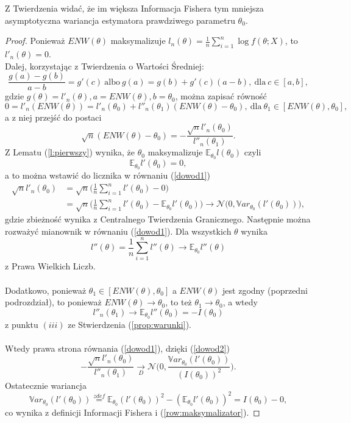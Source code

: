 Z Twierdzenia widać, że im większa Informacja Fishera tym mniejsza asymptotyczna wariancja estymatora prawdziwego parametru $\theta_0$.

\begin{proof}
Ponieważ $ENW(\theta)$ maksymalizuje $l_n(\theta) = \frac{1}{n}\sum\limits_{i=1}^{n}\log f(\theta;X)$, to $l'_n(\theta)=0$. \\ Dalej, korzystając z Twierdzenia o Wartości Średniej:
$$\dfrac{g(a)-g(b)}{a-b} = g'(c) \ \text{albo} \ g(a)=g(b)+g'(c)(a-b), \ \text{dla} \ c \in [a,b],$$
gdzie $g(\theta) = l'_n(\theta), a = ENW(\theta), b = \theta_0$, można zapisać równość
$$ 0 = l'_n(ENW(\theta)) = l'_n(\theta_0) + l''_n(\theta_1)(ENW(\theta)-\theta_0), \ \text{dla} \ \theta_1 \in [ENW(\theta),\theta_0],$$ 
a z niej przejść do postaci 
\begin{equation}\label{dowod1}
\sqrt{n}(ENW(\theta)-\theta_0) = - \dfrac{\sqrt{n}l'_n(\theta_0)}{l''_n(\theta_1)}.
\end{equation}
Z Lematu (\ref{l:pierwszy}) wynika, że $\theta_0$ maksymalizuje $\mathbb{E}_{\theta_0}l(\theta_0)$ czyli
\begin{equation}\label{row:maksymalizator}
\mathbb{E}_{\theta_0}l'(\theta_0) = 0,
\end{equation}
a to można wstawić do licznika w równaniu (\ref{dowod1})
\begin{equation}\label{dowod2}
\begin{split}
\sqrt{n}l'_n(\theta_0) & = \sqrt{n}\Big(\frac{1}{n}\sum\limits_{i=1}^{n}l'(\theta_0) - 0\Big) \\
& = \sqrt{n}\Big(\frac{1}{n}\sum\limits_{i=1}^{n}l'(\theta_0) - \mathbb{E}_{\theta_0}l'(\theta_0)\Big) \rightarrow \mathcal{N}\Big(0, \mathbb{V}ar_{\theta_0}(l'(\theta_0))\Big),
\end{split}
\end{equation}
gdzie zbieżność wynika z Centralnego Twierdzenia Granicznego. 
\newpage
Następnie można rozważyć mianownik w równaniu (\ref{dowod1}). Dla wszystkich $\theta$ wynika
$$l''(\theta) = \frac{1}{n}\sum\limits_{i=1}^{n}l''(\theta) \rightarrow \mathbb{E}_{\theta_0}l''(\theta)$$
z Prawa Wielkich Liczb. \\ \ \\ Dodatkowo, ponieważ $\theta_1 \in [ENW(\theta),\theta_0]$ a $ENW(\theta)$ jest zgodny (poprzedni podrozdział), to ponieważ $ENW(\theta) \rightarrow \theta_0$, to też $\theta_1 \rightarrow \theta_0$, a wtedy
$$l''_n(\theta_1) \rightarrow \mathbb{E}_{\theta_0}l''(\theta_0) = -I(\theta_0)$$
z punktu $(iii)$ ze Stwierdzenia (\ref{prop:warunki}).\\ \ \\ Wtedy prawa strona równania (\ref{dowod1}), dzięki (\ref{dowod2})
$$- \dfrac{\sqrt{n}l'_n(\theta_0)}{l''_n(\theta_1)} \underset{D}{\rightarrow} \mathcal{N}\Big(0,\dfrac{\mathbb{V}ar_{\theta_0}(l'(\theta_0))}{(I(\theta_0))^2} \Big).$$
Ostatecznie wariancja
$$\mathbb{V}ar_{\theta_0}(l'(\theta_0)) \overset{z def}{=} \mathbb{E}_{\theta_0}(l'(\theta_0))^2 - (\mathbb{E}_{\theta_0}l'(\theta_0))^2 = I(\theta_0) - 0,$$
co wynika z definicji Informacji Fishera i (\ref{row:maksymalizator}).

\end{proof}